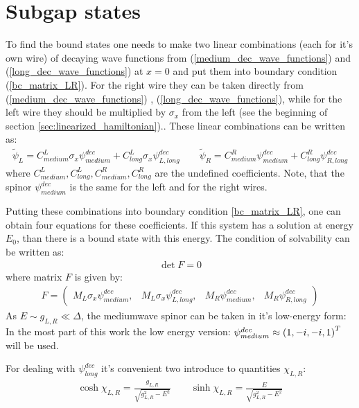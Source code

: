 \section{Subgap states}
\label{sec:Subgap_states}

To find the bound states one needs to make two linear combinations (each for it's own wire) of decaying wave functions from (\ref{medium_dec_wave_functions}) and (\ref{long_dec_wave_functions}) at $ x=0 $ and put them into boundary condition (\ref{bc_matrix_LR}). For the right wire they can be taken directly from (\ref{medium_dec_wave_functions}) , (\ref{long_dec_wave_functions}), while for the left wire they should be multiplied by $ \sigma_x $ from the left (see the beginning of section \ref{sec:linearized_hamiltonian}).. These linear combinations can be written as:
\begin{gather}
	\tilde{\psi}_L
	=
	C_{medium}^L
	\sigma_x \psi^{dec}_{medium}
	+
	C_{long}^L
	\sigma_x \psi^{dec}_{L,long}
\qquad
	\tilde{\psi}_R
	=
	C_{medium}^R
	\psi^{dec}_{medium}
	+
	C_{long}^R
	\psi^{dec}_{R,long}
\end{gather}
where $ C_{medium}^L,C_{long}^L, C_{medium}^R,C_{long}^R $ are the undefined coefficients. Note, that the spinor $ \psi^{dec}_{medium} $ is the same for the left and for the right wires.

 Putting these combinations into boundary condition \ref{bc_matrix_LR}, one can obtain four equations for these coefficients. If this system has a solution at energy $ E_0 $, than there is a bound state with this energy. The condition of solvability can be written as:
\begin{gather}
\label{subgap_determinant}
	\det F = 0
\end{gather}
where matrix $ F $ is given by:
\begin{gather}
F
=
	\begin{pmatrix}
	M_L \sigma_x \psi^{dec}_{medium},
	&
	M_L 
	\sigma_x \psi^{dec}_{L,long},
	&
	M_R
	\psi^{dec}_{medium},
	&
	M_R
	\psi^{dec}_{R,long}
	\end{pmatrix}
\end{gather}
As $ E\sim g_{L,R}\ll\Delta $, the mediumwave spinor can be taken in it's low-energy form: 
In the most part of this work the low energy version: $\psi_{medium}^{dec}\approx
\left(
	1,
	- i,
	- i,
	1
\right)^T
 $
will be used.

For dealing with $ \psi^{dec}_{long} $ it's convenient two introduce to quantities $ \chi_{L,R} $:
\begin{gather}
\cosh\chi_{L,R}
=
\frac{g_{L,R}}{\sqrt{g^2_{L,R}-E^2}}
\qquad
\sinh\chi_{L,R}
=
\frac{E}{\sqrt{g^2_{L,R}-E^2}}
\end{gather}

